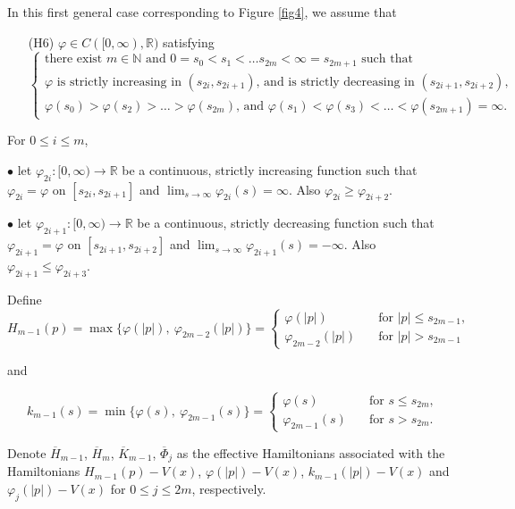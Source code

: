 \documentclass[12pt,reqno]{amsart}
\theoremstyle{plain}
\theoremstyle{remark}
\numberwithin{equation}{section}
\newcommand{\N}{\mathbb{N}}
\newcommand{\R}{\mathbb{R}}
\newcommand{\ol}{\overline}
\begin{document}
In this first general case corresponding to Figure \ref{fig4}, we assume that
\begin{itemize}
\item[(H6)] $\varphi \in C([0,\infty),\R)$ satisfying 
\[
\begin{cases}
\text{there exist $m \in \N$ and $0=s_0 <s_1 < \ldots s_{2m}<\infty=s_{2m+1}$ such that}\\
\text{$\varphi$ is strictly increasing in $(s_{2i},s_{2i+1})$, and is strictly decreasing in $(s_{2i+1},s_{2i+2})$,}\\
\text{$\varphi(s_0)>\varphi(s_2)>\ldots > \varphi(s_{2m})$, and  $\varphi(s_1) < \varphi(s_3) <\ldots < \varphi(s_{2m+1})=\infty$.}
\end{cases}
\]

\end{itemize}

\noindent For $0\leq i\leq m$, 

$\bullet$ let $\varphi_{2i}:[0,\infty)\to \mathbb{R}$ be a continuous, strictly increasing function such that $\varphi_{2i}=\varphi$ on $[s_{2i},s_{2i+1}]$ and  $\lim_{s\to \infty} \varphi_{2i}(s)=\infty$.  Also  $\varphi_{2i}\geq \varphi_{2i+2}$. 

$\bullet$  let $\varphi_{2i+1} : [0,\infty)\to \mathbb{R}$ be a continuous, strictly decreasing function such that $\varphi_{2i+1}=\varphi$ on $[s_{2i+1}, s_{2i+2}]$ and $\lim_{s\to \infty} \varphi_{2i+1}(s)=-\infty$.   Also  $\varphi_{2i+1}\leq \varphi_{2i+3}$. 


Define 
\[
H_{m-1}(p)=\max\{\varphi(|p|), \ \varphi_{2m-2}(|p|)\}=
\begin{cases}
\varphi(|p|)  \quad &\text{for $|p|\leq s_{2m-1}$,}\\
\varphi_{2m-2}(|p|) \quad &\text{for $|p|>s_{2m-1}$}
\end{cases}
\]

and

\[
k_{m-1}(s)=\min\{\varphi(s), \ \varphi_{2m-1}(s)\}=
\begin{cases}
\varphi(s)  \quad &\text{for $s\leq s_{2m}$,}\\
\varphi_{2m-1}(s) \quad &\text{for $s>s_{2m}$.}
\end{cases}
\]

Denote $\ol{H}_{m-1}$,  $\ol H_{m}$,  $\ol{K}_{m-1}$, $\ol{\Phi}_{j}$ as the  effective Hamiltonians associated with 
the Hamiltonians $H_{m-1}(p)-V(x)$,  $\varphi (|p|) - V(x)$,  $k_{m-1}(|p|)- V(x)$ and $\varphi_{j}(|p|)- V(x)$ for $0\leq j\leq 2m$, respectively.  
\end{document}
